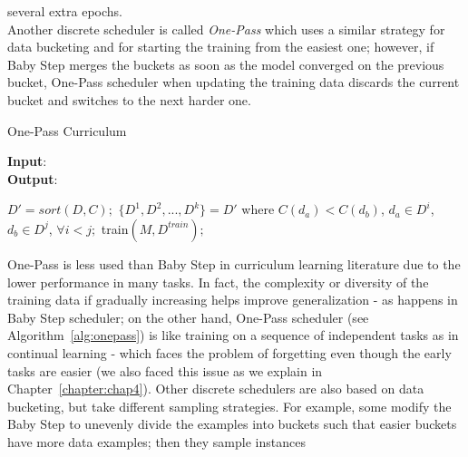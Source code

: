 several extra epochs. \\
Another discrete scheduler is called \textit{One-Pass} which uses a similar strategy for data bucketing and for starting the training from the easiest one;
however, if Baby Step merges the buckets as soon as the model converged on the previous bucket, One-Pass scheduler when updating the training data discards the current bucket
and switches to the next harder one. 
\begin{algorithm}
    \caption{One-Pass Curriculum \cite{cirik2016visualizing}}\label{alg:onepass}
    \hspace*{\algorithmicindent} \textbf{Input}: \\
    \hspace*{\algorithmicindent} \textbf{Output}: 
    \begin{algorithmic}[1]
    \State $D'= sort(D,C);$
    \State $\lbrace D^1, D^2,...,D^k \rbrace = D'$ where $C(d_a) < C(d_b)$, $d_a\in D^i$, $d_b\in D^j$, $\forall i<j;$
        \State train$(M, D^{train});$
        \EndWhile
    \EndFor
    \end{algorithmic}
\end{algorithm}
\newline
One-Pass is less used than Baby Step in curriculum learning literature due to the lower performance in many tasks.
In fact, the complexity or diversity of the training data if gradually increasing
helps improve generalization - as happens in Baby Step scheduler; on the other hand,
One-Pass scheduler (see Algorithm~\ref{alg:onepass}) is like training on a sequence of independent tasks as in 
continual learning - which faces the problem of forgetting even though the early tasks are easier 
(we also faced this issue as we explain in Chapter~\ref{chapter:chap4}).
Other discrete schedulers are also based on data bucketing, but take 
different sampling strategies. For example, some \cite{kocmi2017curriculum} modify the Baby Step to unevenly divide 
the examples into buckets such that easier buckets have more data examples; then they sample instances
